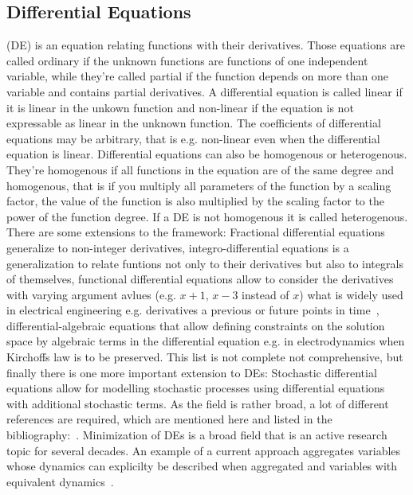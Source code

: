 \documentclass[11pt, rgb]{scrartcl}
\begin{document}
\subsection{Differential Equations} (DE) is an equation relating functions with their derivatives. Those equations are called ordinary if the unknown functions are functions of one independent variable, while they're called partial if the function depends on more than one variable and contains partial derivatives. A differential equation is called linear if it is linear in the unkown function and non-linear if the equation is not expressable as linear in the unknown function. The coefficients of differential equations may be arbitrary, that is e.g. non-linear even when the differential equation is linear. Differential equations can also be homogenous or heterogenous. They're homogenous if all functions in the equation are of the same degree and homogenous, that is if you multiply all parameters of the function by a scaling factor, the value of the function is also multiplied by the scaling factor to the power of the function degree. If a DE is not homogenous it is called heterogenous. There are some extensions to the framework: Fractional differential equations generalize to non-integer derivatives, integro-differential equations is a generalization to relate funtions not only to their derivatives but also to integrals of themselves, functional differential equations allow to consider the derivatives with varying argument avlues (e.g. $x+1$, $x-3$ instead of $x$) what is widely used in electrical engineering e.g. derivatives a previous or future points in time~\autocite{richard}, differential-algebraic equations that allow defining constraints on the solution space by algebraic terms in the differential equation e.g. in electrodynamics when Kirchoffs law is to be preserved. This list is not complete not comprehensive, but finally there is one more important extension to DEs: Stochastic differential equations allow for modelling stochastic processes using differential equations with additional stochastic terms. As the field is rather broad, a lot of different references are required, which are mentioned here and listed in the bibliography:~\autocite{dae, ode_dae, dtsp, fde, handbook_de, ide, nlc, simmons_de, sde}. Minimization of DEs is a broad field that is an active research topic for several decades. An example of a current approach aggregates variables whose dynamics can explicilty be described when aggregated and variables with equivalent dynamics~\autocite{Cardelli2017MaximalAO}. \\
\end{document}
